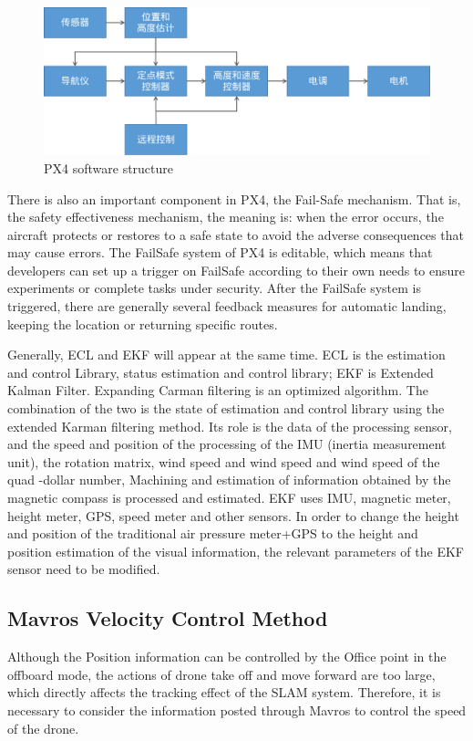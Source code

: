 \documentclass[conference]{IEEEtran}
\begin{document}
\begin{figure}[htbp]
    \centerline{\includegraphics[width=0.95\columnwidth]{px4structure.png}}
    \caption{PX4 software structure}
\end{figure}

There is also an important component in PX4, the Fail-Safe mechanism.
That is, the safety effectiveness mechanism, 
the meaning is: when the error occurs, 
the aircraft protects or restores to a safe state to avoid the adverse consequences that 
may cause errors. 
The FailSafe system of PX4 is editable, 
which means that developers can set up a trigger on FailSafe according to their own needs to ensure experiments or complete tasks under security. 
After the FailSafe system is triggered, there are generally several feedback measures for automatic landing, 
keeping the location or returning specific routes.

Generally, ECL and EKF will appear at the same time. 
ECL is the estimation and control Library, status estimation and control library; 
EKF is Extended Kalman Filter. 
Expanding Carman filtering is an optimized algorithm. 
The combination of the two is the state of estimation and control library using the extended Karman filtering method. 
Its role is the data of the processing sensor, 
and the speed and position of the processing of the IMU (inertia measurement unit), 
the rotation matrix, wind speed and wind speed and wind speed of the quad -dollar number, 
Machining and estimation of information obtained by the magnetic compass is processed and estimated. 
EKF uses IMU, magnetic meter, height meter, GPS, speed meter and other sensors. 
In order to change the height and position of the traditional air pressure meter+GPS to the height 
and position estimation of the visual information, 
the relevant parameters of the EKF sensor need to be modified. 

\subsection{Mavros Velocity Control Method}
Although the Position information can be controlled by the Office point in the offboard mode, 
the actions of drone take off and move forward are too large, 
which directly affects the tracking effect of the SLAM system. 
Therefore, 
it is necessary to consider the information posted through Mavros to control the speed of the drone.
\end{document}
